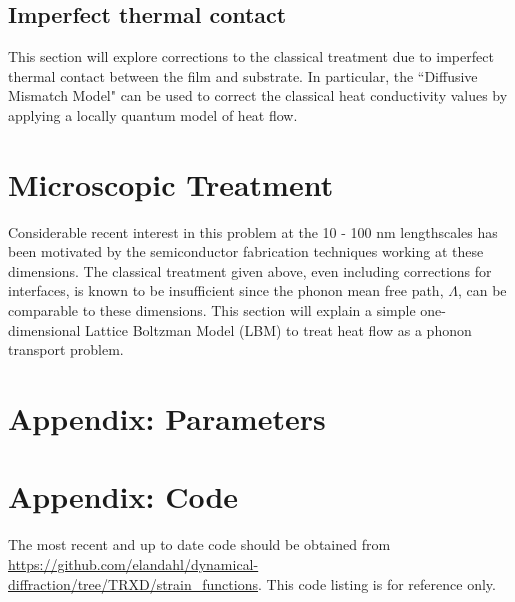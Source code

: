 \documentclass[letterpaper,11pt]{article}
\begin{document}
\subsection{Imperfect thermal contact}
This section will explore corrections to the classical treatment due to imperfect thermal contact between the film and substrate.  In particular, the ``Diffusive Mismatch Model" can be used to correct the classical heat conductivity values by applying a locally quantum model of heat flow.  
\section{Microscopic Treatment}
Considerable recent interest in this problem at the 10 - 100 nm lengthscales has been motivated by the semiconductor fabrication techniques working at these dimensions.  The classical treatment given above, even including corrections for interfaces, is known to be insufficient since the phonon mean free path, $\Lambda$, can be comparable to these dimensions.  This section will explain a simple one-dimensional Lattice Boltzman Model (LBM) to treat heat flow as a phonon transport problem.  
\pagebreak

\section*{Appendix: Parameters}

\section*{Appendix: Code}

The most recent and up to date code should be obtained from \url{https://github.com/elandahl/dynamical-diffraction/tree/TRXD/strain_functions}.  This code listing is for reference only. 
 

\end{document}

